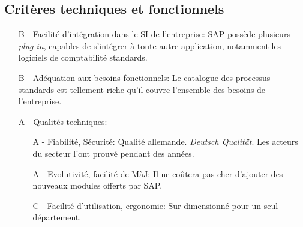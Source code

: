 \subsection{Critères techniques et fonctionnels}

\begin{itemize}
\item[B -] Facilité d'intégration dans le SI de l'entreprise:\el
	SAP possède plusieurs {\sl plug-in}, capables de s'intégrer à toute
    autre application, notamment les logiciels de comptabilité standards.
	
\item[B -] Adéquation aux besoins fonctionnels:\el
	Le catalogue des processus standards est tellement riche qu'il
    couvre l'ensemble des besoins de l'entreprise.
	
\item[A -] Qualités techniques:
    \begin{itemize}
	\item[A -] Fiabilité, Sécurité:\el
		Qualité allemande. {\sl Deutsch Qualität}. Les acteurs du
        secteur l'ont prouvé pendant des années.
	
	\item[A -] Evolutivité, facilité de MàJ:\el
		Il ne coûtera pas cher d'ajouter des nouveaux modules offerts par SAP. 

	\item[C -] Facilité d'utilisation, ergonomie:\el
		Sur-dimensionné pour un seul département.
    \end{itemize}
\end{itemize}
